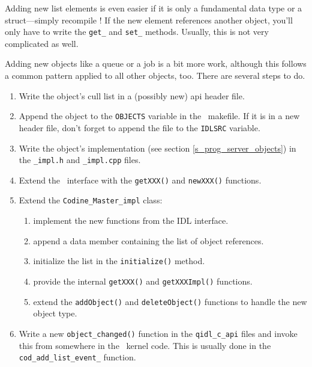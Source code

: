 Adding new list elements is even easier if it is only a fundamental data type
or a struct---simply recompile \qidl! If the new element references another
object, you'll only have to write the \texttt{get\_} and \texttt{set\_}
methods. Usually, this is not very complicated as well.

Adding new objects like a queue or a job is a bit more work, although this
follows a common pattern applied to all other objects, too. There are several
steps to do.

\begin{enumerate}
\item Write the object's cull list in a (possibly new) api header file.
\item Append the object to the \texttt{OBJECTS} variable in the \qidl\
makefile. If it is in a new header file, don't forget to append the file to
the \texttt{IDLSRC} variable.
\item Write the object's implementation (see section
\ref{s_prog_server_objects}) in the \texttt{\_impl.h} and \texttt{\_impl.cpp}
files.
\item Extend the \master\ interface with the \texttt{getXXX()} and
\texttt{newXXX()} functions.
\item Extend the \texttt{Codine\_Master\_impl} class:
   \begin{enumerate}
   \item implement the new functions from the IDL interface.
   \item append a data member containing the list of object references.
   \item initialize the list in the \texttt{initialize()} method.
   \item provide the internal \texttt{getXXX()} and \texttt{getXXXImpl()}
   functions.
   \item extend the \texttt{addObject()} and \texttt{deleteObject()}
   functions to handle the new object type.
   \end{enumerate}
\item Write a new \texttt{object\_changed()} function in the 
\texttt{qidl\_c\_api} files and invoke this from somewhere in the \codine\ 
kernel code. This is usually done in the \texttt{cod\_add\_list\_event\_}
function.
\end{enumerate}
